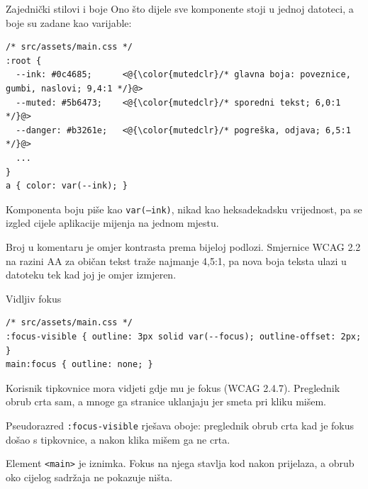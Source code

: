 \begin{frame}[fragile]{Zajednički stilovi i boje}
Ono što dijele sve komponente stoji u jednoj datoteci, a boje su zadane kao varijable:

\begin{lstlisting}
/* src/assets/main.css */
:root {
  --ink: #0c4685;      <@{\color{mutedclr}/* glavna boja: poveznice, gumbi, naslovi; 9,4:1 */}@>
  --muted: #5b6473;    <@{\color{mutedclr}/* sporedni tekst; 6,0:1 */}@>
  --danger: #b3261e;   <@{\color{mutedclr}/* pogreška, odjava; 6,5:1 */}@>
  ...
}
a { color: var(--ink); }
\end{lstlisting}

\vspace{0.2em}
Komponenta boju piše kao \texttt{var(--ink)}, nikad kao heksadekadsku vrijednost, pa se izgled cijele aplikacije mijenja na jednom mjestu.

\vspace{0.2em}
Broj u komentaru je omjer kontrasta prema bijeloj podlozi. Smjernice WCAG 2.2 na razini AA za običan tekst traže najmanje 4,5:1, pa nova boja teksta ulazi u datoteku tek kad joj je omjer izmjeren.
\end{frame}

\begin{frame}[fragile]{Vidljiv fokus}
\begin{lstlisting}
/* src/assets/main.css */
:focus-visible { outline: 3px solid var(--focus); outline-offset: 2px; }
main:focus { outline: none; }
\end{lstlisting}

\vspace{0.3em}
Korisnik tipkovnice mora vidjeti gdje mu je fokus (WCAG 2.4.7). Preglednik obrub crta sam, a mnoge ga stranice uklanjaju jer smeta pri kliku mišem.

\vspace{0.3em}
Pseudorazred \texttt{:focus-visible} rješava oboje: preglednik obrub crta kad je fokus došao s tipkovnice, a nakon klika mišem ga ne crta.

\vspace{0.3em}
Element \texttt{<main>} je iznimka. Fokus na njega stavlja kod nakon prijelaza, a obrub oko cijelog sadržaja ne pokazuje ništa.
\end{frame}

